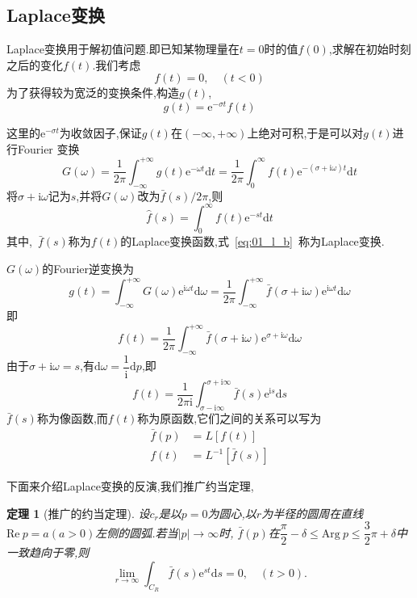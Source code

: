 \documentclass[a4paper,cs4size,adobefonts,fancyhdr]{ctexart}[2005/11/25]
\newcommand{\upcite}[1]{\textsuperscript{\textsuperscript{\cite{#1}}}}
\newcommand{\dif}{\mathrm{d}}
\newtheorem{Theorem}[Definition]{定理}
\newcommand*{\me}{\ensuremath{\mathrm{e}}}    %
\newcommand*{\mi}{\ensuremath{\mathrm{i}}}        %
\begin{document}
\subsection{Laplace变换}
Laplace变换\upcite{Hernandez-Martinez2013}用于解初值问题.即已知某物理量在$t=0$时的值$f(0)$,求解在初始时刻之后的变化$f(t)$.我们考虑
\begin{equation}
 f(t)=0,\quad (t<0)
\end{equation}
为了获得较为宽泛的变换条件,构造$g(t)$,
\begin{equation}
 g(t)=\me^{-\sigma t}f(t)
\end{equation}\par
这里的$\me^{-\sigma t}$为收敛因子,保证$g(t)$在$(-\infty,+\infty)$上绝对可积,于是可以对$g(t)$进行Fourier
变换
\begin{equation*}
G(\omega)=\dfrac{1}{2\pi}\int_{-\infty}^{+\infty} g(t)\me^{-\omega t}\dif t=
\dfrac{1}{2\pi}\int_{0}^{\infty}f(t)\me^{-(\sigma+\mi\omega)t}\dif t
\end{equation*}
将$\sigma+\mi\omega$记为$s$,并将$G(\omega)$改为$\bar{f}(s)/2\pi$,则
\begin{equation}\label{eq:01_l_b}
 \hat{f}(s)=\int_{0}^{\infty}f(t)\me^{-st}\dif t
\end{equation}
其中,~$\bar{f}(s)$称为$f(t)$的Laplace变换函数,式~\eqref{eq:01_l_b}~称为Laplace变换.\par
$G(\omega)$的Fourier逆变换\upcite{Henda2002}为
\begin{equation*}
 g(t)=\int_{-\infty}^{+\infty}G(\omega)\me^{\mi\omega t}\dif\omega
     =\dfrac{1}{2\pi}\int_{-\infty}^{+\infty}\bar{f}(\sigma+\mi\omega)\me^{\mi\omega t}\dif\omega
\end{equation*}
即
\begin{equation}
f(t)=\dfrac{1}{2\pi}\int_{-\infty}^{+\infty}\bar{f}(\sigma+\mi\omega)\me^{\sigma+\mi\omega}\dif\omega
\end{equation}
由于$\sigma+\mi\omega=s$,有$\dif\omega=\dfrac{1}{\mi}\dif p$,即
\begin{equation}
 f(t)=\dfrac{1}{2\pi\mi}\int_{\sigma-\mi\infty}^{\sigma+\mi\infty}\bar{f}(s)\me^{\mi s}\dif s
\end{equation}
$\bar{f}(s)$称为像函数,而$f(t)$称为原函数,它们之间的关系可以写为
\begin{align}
 \bar{f}(p)&=L[f(t)]  \\
 f(t)&=L^{-1}[\bar{f}(s)]
\end{align}\par
下面来介绍Laplace变换的反演,我们推广约当定理\upcite{Ciotti2011},
\begin{Theorem}[推广的约当定理]
 设$c_r$是以$p=0$为圆心,以$r$为半径的圆周在直线$\mathrm{Re}\ p=a(a>0)$左侧的圆弧.若当$|p|\to\infty$时,
 $\bar{f}(p)$在$\dfrac{\pi}{2}-\delta\leq \mathrm{Arg}\ p\leq\dfrac{3}{2}\pi+\delta$中一致趋向于零,则
 \begin{equation}\label{eq:01_l_yd}
  \lim_{r\to\infty}\int_{C_R}\bar{f}(s)\me^{st}\dif s=0,\quad (t>0).
 \end{equation}
\end{Theorem}\par
\end{document}

